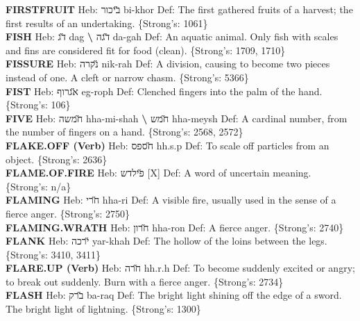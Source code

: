 {\textbf{FIRSTFRUIT} Heb: {\large\H ביכור} bi-khor Def: The first gathered fruits of a harvest; the first results of an undertaking. \{Strong's: 1061\}\hfill{}\\

\textbf{FISH} Heb: {\large\H דג} dag \textbf{\textbackslash{}} {\large\H דגה} da-gah Def: An aquatic animal. Only fish with scales and fins are considered fit for food (clean). \{Strong's: 1709, 1710\}\hfill{}\\

\textbf{FISSURE} Heb: {\large\H נקרה} nik-rah Def: A division, causing to become two pieces instead of one. A cleft or narrow chasm. \{Strong's: 5366\}\hfill{}\\

\textbf{FIST} Heb: {\large\H אגרוף} eg-roph Def: Clenched fingers into the palm of the hand. \{Strong's: 106\}\hfill{}\\

\textbf{FIVE} Heb: {\large\H חמשה} hha-mi-shah \textbf{\textbackslash{}} {\large\H חמש} hha-meysh Def: A cardinal number, from the number of fingers on a hand. \{Strong's: 2568, 2572\}\hfill{}\\

\textbf{FLAKE.OFF (Verb)} Heb: {\large\H חספס} hh.s.p Def: To scale off particles from an object. \{Strong's: 2636\}\hfill{}\\

\textbf{FLAME.OF.FIRE} Heb: {\large\H פילדש} {[}X{]} Def: A word of uncertain meaning. \{Strong's: n/a\}\hfill{}\\

\textbf{FLAMING} Heb: {\large\H חרי} hha-ri Def: A visible fire, usually used in the sense of a fierce anger. \{Strong's: 2750\}\hfill{}\\

\textbf{FLAMING.WRATH} Heb: {\large\H חרון} hha-ron Def: A fierce anger. \{Strong's: 2740\}\hfill{}\\

\textbf{FLANK} Heb: {\large\H ירכה} yar-khah Def: The hollow of the loins between the legs. \{Strong's: 3410, 3411\}\hfill{}\\

\textbf{FLARE.UP (Verb)} Heb: {\large\H חרה} hh.r.h Def: To become suddenly excited or angry; to break out suddenly. Burn with a fierce anger. \{Strong's: 2734\}\hfill{}\\

\textbf{FLASH} Heb: {\large\H ברק} ba-raq Def: The bright light shining off the edge of a sword. The bright light of lightning. \{Strong's: 1300\}\hfill{}\\

}
